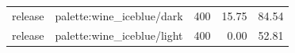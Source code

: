 \begin{longtable}{l>{\raggedright\arraybackslash}p{.42\linewidth}rrr}
release & %
palette:wine\_\allowbreak{}iceblue/dark & %
400 & %
15.75 & %
84.54 \\ %

release & %
palette:wine\_\allowbreak{}iceblue/light & %
400 & %
0.00 & %
52.81 \\ %


\end{longtable}
